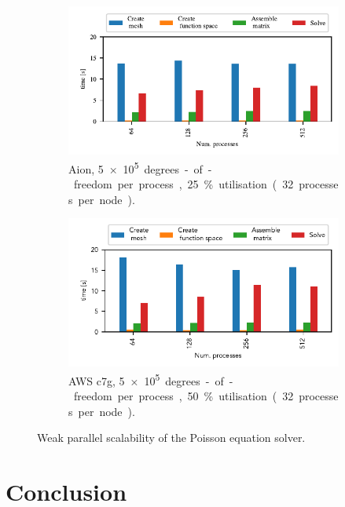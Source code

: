 \begin{figure}
    \begin{subfigure}{.7\textwidth}
        \centering
        \includegraphics{chapters/chp1/graphics/parallel_scaling_plots/output/weak_scaling_aion_poisson.pdf}
        \caption{Aion, \SI{5e+5} degrees-of-freedom per process, 25 \% utilisation (32 processes per node).}
        \label{fig:weak-scaling-aion}
    \end{subfigure}

    \begin{subfigure}{.7\textwidth}
        \centering
        \includegraphics{chapters/chp1/graphics/parallel_scaling_plots/output/weak_scaling_aws_big_poisson.pdf}
        \caption{AWS c7g, \SI{5e+5} degrees-of-freedom per process, 50 \% utilisation (32 processes per node).}
        \label{fig:weak-scaling-aws}
    \end{subfigure}
    \caption{Weak parallel scalability of the Poisson equation solver.}
    \label{fig:weak-scaling}
\end{figure}

\section*{Conclusion}

